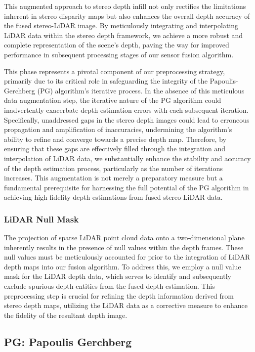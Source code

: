 \documentclass[conference]{IEEEtran}
\begin{document}
This augmented approach to stereo depth infill not only rectifies the limitations inherent in stereo disparity maps but also enhances the overall depth accuracy of the fused stereo-LiDAR image. By meticulously integrating and interpolating LiDAR data within the stereo depth framework, we achieve a more robust and complete representation of the scene's depth, paving the way for improved performance in subsequent processing stages of our sensor fusion algorithm.

This phase represents a pivotal component of our preprocessing strategy, primarily due to its critical role in safeguarding the integrity of the Papoulis-Gerchberg (PG) algorithm's iterative process. In the absence of this meticulous data augmentation step, the iterative nature of the PG algorithm could inadvertently exacerbate depth estimation errors with each subsequent iteration. Specifically, unaddressed gaps in the stereo depth images could lead to erroneous propagation and amplification of inaccuracies, undermining the algorithm's ability to refine and converge towards a precise depth map. Therefore, by ensuring that these gaps are effectively filled through the integration and interpolation of LiDAR data, we substantially enhance the stability and accuracy of the depth estimation process, particularly as the number of iterations increases. This augmentation is not merely a preparatory measure but a fundamental prerequisite for harnessing the full potential of the PG algorithm in achieving high-fidelity depth estimations from fused stereo-LiDAR data.

\subsubsection{LiDAR Null Mask} \label{lidar-null-mask}

The projection of sparse LiDAR point cloud data onto a two-dimensional plane inherently results in the presence of null values within the depth frames. These null values must be meticulously accounted for prior to the integration of LiDAR depth maps into our fusion algorithm. To address this, we employ a null value mask for the LiDAR depth data, which serves to identify and subsequently exclude spurious depth entities from the fused depth estimation. This preprocessing step is crucial for refining the depth information derived from stereo depth maps, utilizing the LiDAR data as a corrective measure to enhance the fidelity of the resultant depth image.

\subsection{PG: Papoulis Gerchberg}
\end{document}
